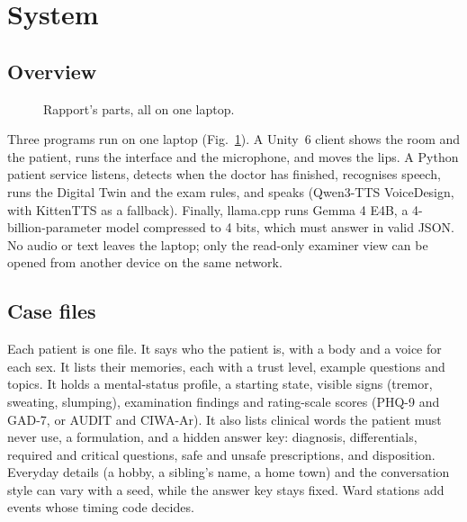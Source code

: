\documentclass[conference]{IEEEtran}
\begin{document}
\section{System}
\subsection{Overview}

\begin{figure}[t]
\centering
{}
\caption{Rapport's parts, all on one laptop.}
\label{fig:overview}
\end{figure}

Three programs run on one laptop (Fig.~\ref{fig:overview}). A Unity~6 client shows the room and the patient, runs the interface and the microphone, and moves the lips. A Python patient service listens, detects when the doctor has finished, recognises speech, runs the Digital Twin and the exam rules, and speaks (Qwen3-TTS VoiceDesign, with KittenTTS as a fallback). Finally, llama.cpp \cite{llamacpp} runs Gemma 4 E4B, a 4-billion-parameter model compressed to 4 bits, which must answer in valid JSON. No audio or
text leaves the laptop; only the read-only examiner view can be opened from another device on the same network.

\subsection{Case files}
Each patient is one file. It says who the patient is, with a body and a voice for each sex. It lists their memories, each with a trust level, example questions and topics. It holds a mental-status profile, a starting state, visible signs (tremor, sweating, slumping), examination findings and rating-scale scores (PHQ-9 and GAD-7, or AUDIT and CIWA-Ar). It also lists clinical words the patient must never use, a formulation, and a hidden answer key: diagnosis, differentials, required and critical questions, safe and unsafe prescriptions, and disposition. Everyday details (a hobby, a sibling's name, a home town) and the conversation style can
vary with a seed, while the answer key stays fixed. Ward stations add events whose timing code decides.
\end{document}
